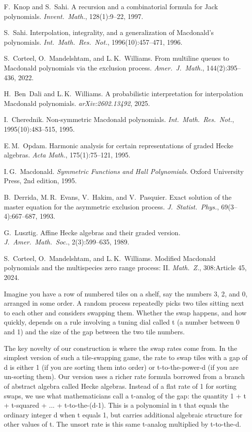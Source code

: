 
 F.~Knop and S.~Sahi.
A recursion and a combinatorial formula for Jack polynomials.
\emph{Invent.\ Math.}, 128(1):9--22, 1997.

 S.~Sahi.
Interpolation, integrality, and a generalization of Macdonald's polynomials.
\emph{Int.\ Math.\ Res.\ Not.}, 1996(10):457--471, 1996.

 S.~Corteel, O.~Mandelshtam, and L.\,K.~Williams.
From multiline queues to Macdonald polynomials via the exclusion process.
\emph{Amer.\ J.\ Math.}, 144(2):395--436, 2022.

 H.~Ben~Dali and L.\,K.~Williams.
A probabilistic interpretation for interpolation Macdonald polynomials.
\emph{arXiv:2602.13492}, 2025.

 I.~Cherednik.
Non-symmetric Macdonald polynomials.
\emph{Int.\ Math.\ Res.\ Not.}, 1995(10):483--515, 1995.

 E.\,M.~Opdam.
Harmonic analysis for certain representations of graded Hecke algebras.
\emph{Acta Math.}, 175(1):75--121, 1995.

 I.\,G.~Macdonald.
\emph{Symmetric Functions and Hall Polynomials}.
Oxford University Press, 2nd edition, 1995.

 B.~Derrida, M.\,R.~Evans, V.~Hakim, and V.~Pasquier.
Exact solution of the master equation for the asymmetric exclusion process.
\emph{J.\ Statist.\ Phys.}, 69(3--4):667--687, 1993.

 G.~Lusztig.
Affine Hecke algebras and their graded version.
\emph{J.\ Amer.\ Math.\ Soc.}, 2(3):599--635, 1989.

 S.~Corteel, O.~Mandelshtam, and L.\,K.~Williams.
Modified Macdonald polynomials and the multispecies zero range process: II.
\emph{Math.\ Z.}, 308:Article 45, 2024.


Imagine you have a row of numbered tiles on a shelf, say the numbers 3,
2, and 0, arranged in some order. A random process repeatedly picks two
tiles sitting next to each other and considers swapping them. Whether
the swap happens, and how quickly, depends on a rule involving a
tuning dial called t (a number between 0 and 1) and the size of the
gap between the two tile numbers.

The key novelty of our construction is where the swap rates come from.
In the simplest version of such a tile-swapping game, the rate to swap
tiles with a gap of d is either 1 (if you are sorting them into order)
or t-to-the-power-d (if you are un-sorting them). Our version uses a
richer rate formula borrowed from a branch of abstract algebra called
Hecke algebras. Instead of a flat rate of 1 for sorting swaps, we use
what mathematicians call a t-analog of the gap: the quantity
1 + t + t-squared + ... + t-to-the-(d-1). This is a polynomial in t
that equals the ordinary integer d when t equals 1, but carries
additional algebraic structure for other values of t. The unsort rate
is this same t-analog multiplied by t-to-the-d.

